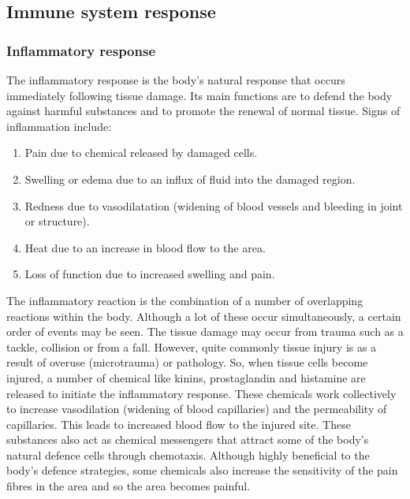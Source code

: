 	\subsection{Immune system response}

		\subsubsection{Inflammatory response}
		The inflammatory response is the body’s natural response that occurs immediately following tissue damage.
		Its main functions are to defend the body against harmful substances and to promote the renewal of normal tissue.
		Signs of inflammation include:

		\begin{multicols}{2}
			\begin{enumerate}
				\item Pain due to chemical released by damaged cells.
				\item Swelling or edema due to an influx of fluid into the damaged region.
				\item Redness due to vasodilatation (widening of blood vessels and bleeding in joint or structure).
				\item Heat due to an increase in blood flow to the area.
				\item Loss of function due to increased swelling and pain.
			\end{enumerate}
		\end{multicols}

		The inflammatory reaction is the combination of a number of overlapping reactions within the body.
		Although a lot of these occur simultaneously, a certain order of events may be seen.
		The tissue damage may occur from trauma such as a tackle, collision or from a fall.
		However, quite commonly tissue injury is as a result of overuse (microtrauma) or pathology.
		So, when tissue cells become injured, a number of chemical like kinins, prostaglandin and histamine are released to initiate the inflammatory response.
		These chemicals work collectively to increase vasodilation (widening of blood capillaries) and the permeability of capillaries.
		This leads to increased blood flow to the injured site.
		These substances also act as chemical messengers that attract some of the body’s natural defence cells through chemotaxis.
		Although highly beneficial to the body’s defence strategies, some chemicals also increase the sensitivity of the pain fibres in the area and so the area becomes painful.

